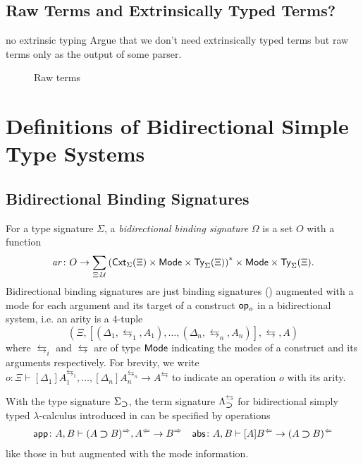 \documentclass[acmsmall]{acmart}
\theoremstyle{acmdefinition}
\begin{document}
\subsection{Raw Terms and Extrinsically Typed Terms?}
\begin{LTannote}{no extrinsic typing}
Argue that we don't need extrinsically typed terms but raw terms only as the output of some parser.
\end{LTannote}

\begin{figure}
  \centering
  \begin{mathpar}
  \end{mathpar}
  
  \caption{Raw terms}
\end{figure}

\section{Definitions of Bidirectional Simple Type Systems} 

\subsection{Bidirectional Binding Signatures}

\begin{definition}
  For a type signature $\Sigma$, a \emph{bidirectional binding signature} $\Omega$ is a set $O$ with a function
  \[
    \mathit{ar}\colon O \to \sum_{\Xi : \UU} \left(\Cxt_{\Sigma}(\Xi) \times \Mode \times \Type_{\Sigma}(\Xi)\right)^* \times \Mode \times \Type_{\Sigma}(\Xi).
  \]
  Bidirectional binding signatures are just binding signatures () augmented with a mode for each argument and its target of a construct $\termOp_o$ in a bidirectional system, i.e.
  an arity is a $4$-tuple
  \[
    \left(\Xi, \left[\left(\Delta_1, \leftrightarrows_1, A_1\right), \ldots, \left(\Delta_{n}, \leftrightarrows_n, A_{n}\right) \right], \leftrightarrows, A\right)
  \]
  where ${\leftrightarrows_i}$ and ${\leftrightarrows}$ are of type $\Mode$ indicating the modes of a construct and its arguments respectively.
  For brevity, we write $o \colon \Xi \vdash [\Delta_1]A_{1}^{\leftrightarrows_1}, \ldots, [\Delta_{n}] A^{\leftrightarrows_n}_{n} \to A^{\leftrightarrows}$ to indicate an operation $o$ with its arity. 
\end{definition}

\begin{example}
  With the type signature $\Sigma_{\bto}$, the term signature $\Lambda_{\bto}^{\leftrightarrows}$ for bidirectional simply typed $\lambda$-calculus introduced in  can be specified by operations 
  \begin{align*}
    \mathsf{app}\colon A, B \vdash (A \bto B)^{\Rightarrow}, A^{\Leftarrow} \to B^{\Rightarrow} &&
    \mathsf{abs}\colon A , B \vdash [A]B^{\Leftarrow} \to (A \bto B)^{\Leftarrow}
  \end{align*}
  like those in  but augmented with the mode information.
\end{example}
\end{document}
